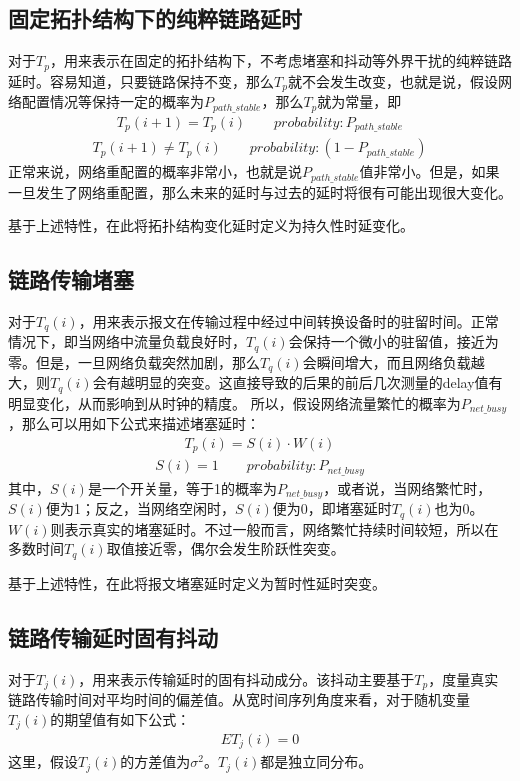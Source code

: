 \subsection{固定拓扑结构下的纯粹链路延时}
对于$T_{p}$，用来表示在固定的拓扑结构下，不考虑堵塞和抖动等外界干扰的纯粹链路延时。容易知道，只要链路保持不变，那么$T_{p}$就不会发生改变，也就是说，假设网络配置情况等保持一定的概率为$P_{path\_stable}$，那么$T_{p}$就为常量，即
\begin {align}
T_{p}(i+1) = T_{p}(i) \qquad probability: P_{path\_stable}
\end{align}
\begin {align}
T_{p}(i+1) \neq T_{p}(i) \qquad probability: (1-P_{path\_stable})
\end{align}
正常来说，网络重配置的概率非常小，也就是说$P_{path\_stable}$值非常小。但是，如果一旦发生了网络重配置，那么未来的延时与过去的延时将很有可能出现很大变化。

基于上述特性，在此将拓扑结构变化延时定义为持久性时延变化。

\subsection{链路传输堵塞}
对于$T_{q}(i)$，用来表示报文在传输过程中经过中间转换设备时的驻留时间。正常情况下，即当网络中流量负载良好时，$T_{q}(i)$会保持一个微小的驻留值，接近为零。但是，一旦网络负载突然加剧，那么$T_{q}(i)$会瞬间增大，而且网络负载越大，则$T_{q}(i)$会有越明显的突变。这直接导致的后果的前后几次测量的delay值有明显变化，从而影响到从时钟的精度。
所以，假设网络流量繁忙的概率为$P_{net\_busy}$，那么可以用如下公式来描述堵塞延时：
\begin {align}
T_{p}(i) = S(i) \cdot W(i) 
\end{align}
\begin {align}
S(i) = 1 \qquad probability: P_{net\_busy}
\end{align}
其中，$S(i)$是一个开关量，等于1的概率为$P_{net\_busy}$，或者说，当网络繁忙时，$S(i)$便为1；反之，当网络空闲时，$S(i)$便为0，即堵塞延时$T_{q}(i)$也为0。$W(i)$则表示真实的堵塞延时。不过一般而言，网络繁忙持续时间较短，所以在多数时间$T_{q}(i)$取值接近零，偶尔会发生阶跃性突变。

基于上述特性，在此将报文堵塞延时定义为暂时性延时突变。

\subsection{链路传输延时固有抖动}
对于$T_{j}(i)$，用来表示传输延时的固有抖动成分。该抖动主要基于$T_{p}$，度量真实链路传输时间对平均时间的偏差值。从宽时间序列角度来看，对于随机变量$T_{j}(i)$的期望值有如下公式\supercite{33}：
\begin {align}
E{T_{j}(i)} = 0
\end {align}
这里，假设$T_{j}(i)$的方差值为$\sigma ^{2}$。$T_{j}(i)$都是独立同分布。

